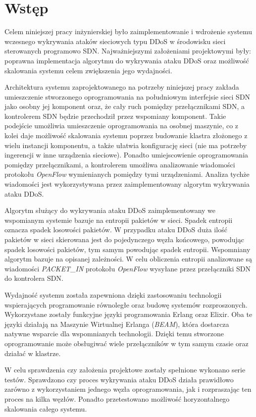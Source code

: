 \chapter{Wstęp}

Celem niniejszej pracy inżynierskiej było zaimplementowanie i wdrożenie systemu
wczesnego wykrywania ataków sieciowych typu DDoS w środowisku sieci sterowanych
programowo SDN. Najważniejszymi założeniami projektowymi były: poprawna
implementacja algorytmu do wykrywania ataku DDoS oraz możliwość skalowania
systemu celem zwiększenia jego wydajności.

Architektura systemu zaprojektowanego na potrzeby niniejszej pracy zakłada
umieszczenie stworzonego oprogramowania na południowym interfejsie sieci SDN
jako osobny jej komponent oraz, że cały ruch pomiędzy przełącznikami SDN, a
kontrolerem SDN będzie przechodził przez wspomiany komponent. Takie podejście
umożliwia umieszczenie oprogramowania na osobnej maszynie, co z kolei daje
możliwość skalowania systemu poprzez budowanie klastra złożonego z wielu
instancji komponentu, a także ułatwia konfigurację sieci (nie ma potrzeby
ingerencji w inne urządzenia sieciowe). Ponadto umiejscowienie oprogramowania
pomiędzy przełącznikami, a kontrolerem umożliwa analizowanie wiadomości
protokołu \textit{OpenFlow} wymienianych pomiędzy tymi urządzeniami. Analiza
tychże wiadomości jest wykorzystywana przez zaimplementowany algorytm wykrywania
ataku DDoS.

Algorytm służący do wykrywania ataku DDoS zaimplementowany we wspomianym
systemie bazuje na entropii pakietów w sieci. Spadek entropii oznacza spadek
losowości pakietów. W przypadku ataku DDoS duża ilość pakietów w sieci
skierowana jest do pojedynczego węzła końcowego, powodując spadek losowości
pakietów, tym samym powodując spadek entropii. Wspomniany algorytm bazuje na
opisanej zależności. W celu obliczenia entropii analizowane są wiadomości
\textit{PACKET\_IN} protokołu \textit{OpenFlow} wysyłane przez przełączniki SDN
do kontrolera SDN.

Wydajność systemu została zapewniona dzięki zastosowaniu technologii
wspierających programowanie równoległe oraz budowę systemów rozproszonych.
Wykorzystane zostały funkcyjne języki programowania Erlang oraz Elixir. Oba te
języki działają na Maszynie Wirtualnej Erlanga (\textit{BEAM}), która dostarcza
natywne wsparcie dla wspomnianych technologii. Dzięki temu stworzone
oprogramowanie może obsługiwać wiele przełączników w tym samym czasie oraz
działać w klastrze.

W celu sprawdzenia czy założenia projektowe zostały spełnione wykonano serie
testów. Sprawdzono czy proces wykrywania ataku DDoS działa prawidłowo zarówno z
wykorzystaniem jednego węzła oprogramowania, jak i rozpraszając ten proces na
kilka węzłów. Ponadto przetestowano możliwość horyzontalnego skalowania całego
systemu.